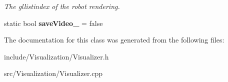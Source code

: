 \begin{DoxyCompactItemize}
\begin{DoxyCompactList}\small\item\em The gllistindex of the robot rendering. \end{DoxyCompactList}\item 
\hypertarget{class_visualizer_acd3d34da61205b149eedbf605bba9636}{static bool {\bfseries save\-Video\-\_\-} = false}\label{class_visualizer_acd3d34da61205b149eedbf605bba9636}

\end{DoxyCompactItemize}


The documentation for this class was generated from the following files\-:\begin{DoxyCompactItemize}
\item 
include/\-Visualization/Visualizer.\-h\item 
src/\-Visualization/Visualizer.\-cpp\end{DoxyCompactItemize}
